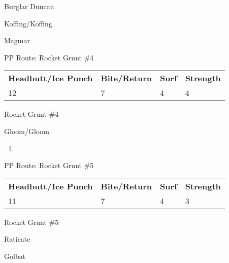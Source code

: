 \begin{paracol}{2}
\switchcolumn
\begin{trainer}{Burglar Duncan}
	\varwb
	\begin{fightSection}{Koffing/Koffing}
		\item {} \bite{} 
	\end{fightSection}
	\begin{fightSection}{Magmar}
		\item {} \strength
	\end{fightSection}
	\varwe
\end{trainer}

\switchcolumn*
\begin{misc}{PP Route: Rocket Grunt \#4}
	\varwb
	\begin{tabu} to \textwidth {X[6,c] X[5,c] X[4,c] X[4,c]}
		\textbf{Headbutt/Ice Punch} & \textbf{Bite/Return} & \textbf{Surf} & \textbf{Strength}\\ 
		12 & 7 & 4 & 4
	\end{tabu}
	\varwe
\end{misc}

\switchcolumn
\begin{trainer}{Rocket Grunt \#4}
	\varwb
	\begin{fightSection}{Gloom/Gloom}
		\item {} \strength{} 
	\end{fightSection}
	\varwe
\end{trainer}

\begin{enumerate}[resume]
	\item {}
\end{enumerate}

\switchcolumn*
\begin{misc}{PP Route: Rocket Grunt \#5}
	\varwb
	\begin{tabu} to \textwidth {X[6,c] X[5,c] X[4,c] X[4,c]}
		\textbf{Headbutt/Ice Punch} & \textbf{Bite/Return} & \textbf{Surf} & \textbf{Strength}\\ 
		11 & 7 & 4 & 3
	\end{tabu}
	\varwe
\end{misc}

\switchcolumn
\begin{trainer}{Rocket Grunt \#5}
	\varwb
	\begin{fightSection}{Raticate}
		\item {} \icePunch
	\end{fightSection}
	\begin{fightSection}{Golbat}
		\item {} \strength
	\end{fightSection}
	\varwe
\end{trainer}


\end{paracol}
